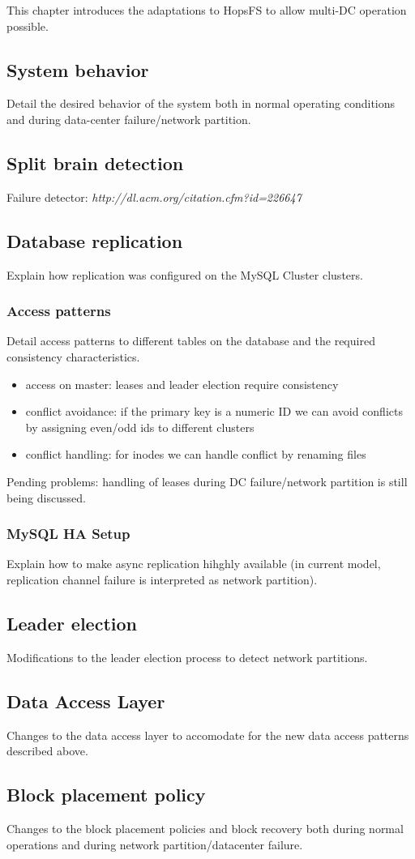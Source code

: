 This chapter introduces the adaptations to HopsFS to allow multi-DC operation possible.

\subsection{System behavior}
Detail the desired behavior of the system both in normal operating conditions and during data-center failure/network partition.

\subsection{Split brain detection}
Failure detector: 
\textit{http://dl.acm.org/citation.cfm?id=226647}

\subsection{Database replication}
Explain how replication was configured on the MySQL Cluster clusters.
\subsubsection{Access patterns}
Detail access patterns to different tables on the database and the required consistency characteristics.
\begin{itemize}
    \item access on master: leases and leader election require consistency
    \item conflict avoidance: if the primary key is a numeric ID we can avoid conflicts by assigning even/odd ids to different clusters
    \item conflict handling: for inodes we can handle conflict by renaming files
\end{itemize}

Pending problems: handling of leases during DC failure/network partition is still being discussed.

\subsubsection{MySQL HA Setup}
Explain how to make async replication hihghly available (in current model, replication channel failure is interpreted as network partition).

\subsection{Leader election}
Modifications to the leader election process to detect network partitions.
\subsection{Data Access Layer}
Changes to the data access layer to accomodate for the new data access patterns described above.
\subsection{Block placement policy}
Changes to the block placement policies and block recovery both during normal operations and during network partition/datacenter failure.
